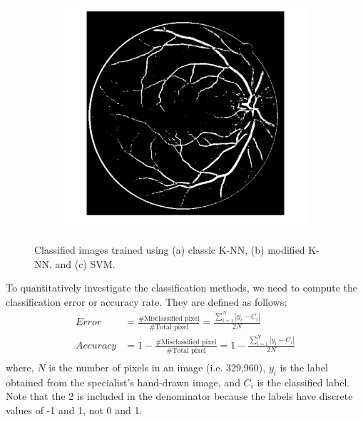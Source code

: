 \documentclass[12pt, notitlepage]{article}
\begin{document}
\begin{figure}[H]
\begin{subfigure}{0.4\columnwidth}
\caption{}
\label{fig:}
\end{subfigure}
\begin{subfigure}{0.4\columnwidth}
\includegraphics[width=\columnwidth]{figures/rslt_svm_better_6}
\caption{}
\label{fig:}
\end{subfigure}
\caption{Classified images trained using (a) classic K-NN, (b) modified K-NN, and (c) SVM.}
\label{fig:rslt}
\end{figure}
  


To quantitatively investigate the classification methods, we need to compute the classification error or accuracy rate. They are defined as follows:
\begin{equation}
\begin{aligned}
Error &= \frac{\text{\# Misclassified pixel}}{\text{\# Total pixel}} = \frac{\sum_{i=1}^N|y_i - C_i|}{2N} \\
Accuracy &= 1- \frac{\text{\# Misclassified pixel}}{\text{\# Total pixel}} = 1- \frac{\sum_{i=1}^N|y_i - C_i|}{2N} \\
\end{aligned}
\end{equation}
where, $N$ is the number of pixels in an image (i.e.  329,960), $y_i$ is the label obtained from the specialist's hand-drawn image, and $C_i$ is the classified label. Note that the 2 is included in the denominator because the labels have discrete values of -1 and 1, not 0 and 1. 
\end{document}
